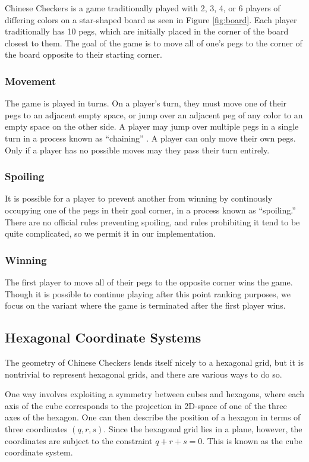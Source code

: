 \documentclass[12pt, a4paper, twocolumn]{article}
\begin{document}
Chinese Checkers is a game traditionally played with 2, 3, 4, or 6 players of differing colors on a star-shaped board as seen in Figure \ref{fig:board}. Each player traditionally has 10 pegs, which are initially placed in the corner of the board closest to them. The goal of the game is to move all of one's pegs to the corner of the board opposite to their starting corner.

\subsubsection{Movement}
The game is played in turns. On a player's turn, they must move one of their pegs to an adjacent empty space, or jump over an adjacent peg of any color to an empty space on the other side. A player may jump over multiple pegs in a single turn in a process known as ``chaining'' \cite{ChainingJumps}. A player can only move their own pegs. Only if a player has no possible moves may they pass their turn entirely.

\subsubsection{Spoiling}
It is possible for a player to prevent another from winning by continously occupying one of the pegs in their goal corner, in a process known as ``spoiling.'' \cite{ChineseCheckersSpoiling} There are no official rules preventing spoiling, and rules prohibiting it tend to be quite complicated, so we permit it in our implementation.

\subsubsection{Winning}
The first player to move all of their pegs to the opposite corner wins the game. Though it is possible to continue playing after this point ranking purposes, we focus on the variant where the game is terminated after the first player wins.

\subsection{Hexagonal Coordinate Systems}

The geometry of Chinese Checkers lends itself nicely to a hexagonal grid, but it is nontrivial to represent hexagonal grids, and there are various ways to do so. \cite{HexagonalCoordinates}

One way involves exploiting a symmetry between cubes and hexagons, where each axis of the cube corresponds to the projection in 2D-space of one of the three axes of the hexagon. One can then describe the position of a hexagon in terms of three coordinates $(q, r, s)$. Since the hexagonal grid lies in a plane, however, the coordinates are subject to the constraint $q + r + s = 0$. This is known as the cube coordinate system.
\end{document}
